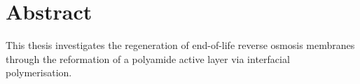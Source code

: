 \chapter*{Abstract}



This thesis investigates the regeneration of end-of-life reverse osmosis
membranes through the reformation of a polyamide active layer via interfacial
polymerisation.

\lipsum[1][1-10] %